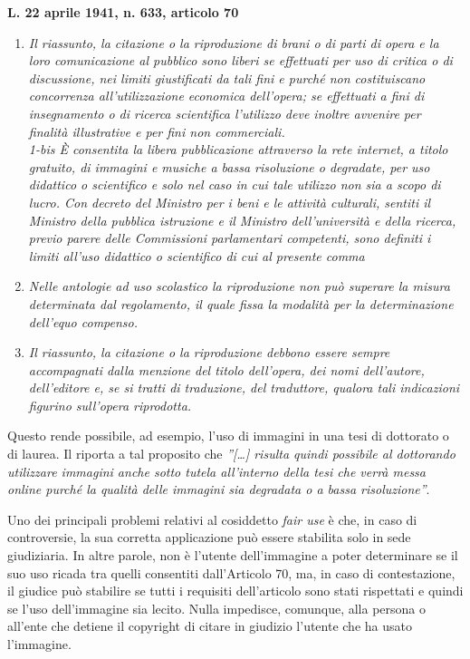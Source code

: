 \documentclass[9pt,a4paper,twoside]{rho-class/rho}
\begin{document}
\textbf{L. 22 aprile 1941, n. 633, articolo 70}
\begin{enumerate}
\item \textit{Il riassunto, la citazione o la riproduzione di brani o di parti di opera e la loro comunicazione al pubblico sono liberi se effettuati per uso di critica o di discussione, nei limiti giustificati da tali fini e purché non costituiscano concorrenza all'utilizzazione economica dell'opera; se effettuati a fini di insegnamento o di ricerca scientifica l'utilizzo deve inoltre avvenire per finalità illustrative e per fini non commerciali. \\ 1-bis È consentita la libera pubblicazione attraverso la rete internet, a titolo gratuito, di immagini e musiche a bassa risoluzione o degradate, per uso didattico o scientifico e solo nel caso in cui tale utilizzo non sia a scopo di lucro. Con decreto del Ministro per i beni e le attività culturali, sentiti il Ministro della pubblica istruzione e il Ministro dell'università e della ricerca, previo parere delle Commissioni parlamentari competenti, sono definiti i limiti all'uso didattico o scientifico di cui al presente comma}

\item \textit{ Nelle antologie ad uso scolastico la riproduzione non può superare la misura determinata dal regolamento, il quale fissa la modalità per la determinazione dell'equo compenso.}

\item \textit{ Il riassunto, la citazione o la riproduzione debbono essere sempre accompagnati dalla menzione del titolo dell'opera, dei nomi dell'autore, dell'editore e, se si tratti di traduzione, del traduttore, qualora tali indicazioni figurino sull'opera riprodotta.}
\end{enumerate}

Questo rende possibile, ad esempio, l’uso di immagini in una tesi di dottorato o di laurea. Il \textcite{CRUI} riporta a tal proposito che \textit{”[…] risulta quindi possibile al dottorando utilizzare immagini anche sotto tutela all’interno della tesi che verrà messa online purché la qualità delle immagini sia degradata o a bassa risoluzione”}.

Uno dei principali problemi relativi al cosiddetto \textit{fair use} è che, in caso di controversie, la sua corretta applicazione può essere stabilita solo in sede giudiziaria. In altre parole, non è l’utente dell’immagine a poter determinare se il suo uso ricada tra quelli consentiti dall’Articolo 70, ma, in caso di contestazione, il giudice può stabilire se tutti i requisiti dell’articolo sono stati rispettati e quindi se l’uso dell’immagine sia lecito. Nulla impedisce, comunque, alla persona o all’ente che detiene il copyright di citare in giudizio l’utente che ha usato l'immagine.
\end{document}

